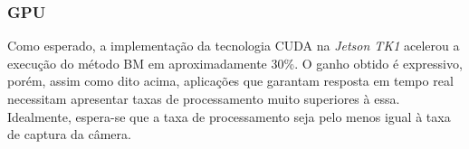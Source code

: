 \subsubsection{GPU}
Como esperado, a implementação da tecnologia CUDA na \textit{Jetson TK1} acelerou a execução do método BM em aproximadamente 30\%. O ganho obtido é expressivo, porém, assim como dito acima, aplicações que garantam resposta em tempo real necessitam apresentar taxas de processamento muito superiores à essa. Idealmente, espera-se que a taxa de processamento seja pelo menos igual à taxa de captura da câmera.

